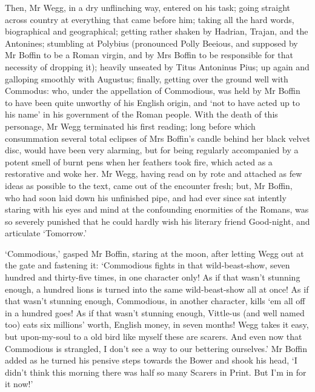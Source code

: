 Then, Mr Wegg, in a dry unflinching way, entered on his task; going
straight across country at everything that came before him; taking all
the hard words, biographical and geographical; getting rather shaken by
Hadrian, Trajan, and the Antonines; stumbling at Polybius (pronounced
Polly Beeious, and supposed by Mr Boffin to be a Roman virgin, and by
Mrs Boffin to be responsible for that necessity of dropping it); heavily
unseated by Titus Antoninus Pius; up again and galloping smoothly with
Augustus; finally, getting over the ground well with Commodus: who,
under the appellation of Commodious, was held by Mr Boffin to have been
quite unworthy of his English origin, and ‘not to have acted up to his
name’ in his government of the Roman people. With the death of this
personage, Mr Wegg terminated his first reading; long before which
consummation several total eclipses of Mrs Boffin’s candle behind
her black velvet disc, would have been very alarming, but for being
regularly accompanied by a potent smell of burnt pens when her feathers
took fire, which acted as a restorative and woke her. Mr Wegg, having
read on by rote and attached as few ideas as possible to the text, came
out of the encounter fresh; but, Mr Boffin, who had soon laid down his
unfinished pipe, and had ever since sat intently staring with his eyes
and mind at the confounding enormities of the Romans, was so severely
punished that he could hardly wish his literary friend Good-night, and
articulate ‘Tomorrow.’

‘Commodious,’ gasped Mr Boffin, staring at the moon, after letting
Wegg out at the gate and fastening it: ‘Commodious fights in that
wild-beast-show, seven hundred and thirty-five times, in one character
only! As if that wasn’t stunning enough, a hundred lions is turned into
the same wild-beast-show all at once! As if that wasn’t stunning enough,
Commodious, in another character, kills ‘em all off in a hundred goes!
As if that wasn’t stunning enough, Vittle-us (and well named too) eats
six millions’ worth, English money, in seven months! Wegg takes it easy,
but upon-my-soul to a old bird like myself these are scarers. And even
now that Commodious is strangled, I don’t see a way to our bettering
ourselves.’ Mr Boffin added as he turned his pensive steps towards the
Bower and shook his head, ‘I didn’t think this morning there was half so
many Scarers in Print. But I’m in for it now!’


